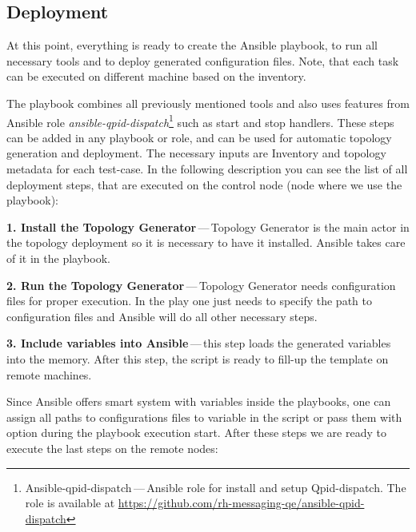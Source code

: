 \subsection{Deployment}
At this point, everything is ready to create the Ansible playbook, to run all necessary tools and to deploy generated configuration files. Note, that each task can be executed on different machine based on the inventory.

The playbook combines all previously mentioned tools and also uses features from Ansible role \emph{ansible-qpid-dispatch}\footnote{Ansible-qpid-dispatch\,---\,Ansible role for install
and setup Qpid-dispatch. The role is available at \url{https://github.com/rh-messaging-qe/ansible-qpid-dispatch}} such as start and stop handlers. These steps can be added in any playbook or role, and can be used for automatic topology generation and deployment. The necessary inputs are Inventory and topology metadata for each test-case. In the following description you can see the list of all deployment steps, that are executed on the control node (node where we use the playbook):

\begin{description}
	\item \textbf{1. Install the Topology Generator}\,---\,Topology Generator is the main actor in the topology deployment so it is necessary to have it installed. Ansible takes care of it in the playbook.
	\item \textbf{2. Run the Topology Generator}\,---\,Topology Generator needs configuration files for proper execution. In the play one just needs to specify the path to configuration files and Ansible will do all other necessary steps.
	\item \textbf{3. Include variables into Ansible}\,---\,this step loads the generated variables into the memory. After this step, the script is ready to fill-up the template on remote machines.
\end{description}

Since Ansible offers smart system with variables inside the playbooks, one can assign all paths to configurations files to variable in the script or pass them with option during the playbook execution start. After these steps we are ready to execute the last steps on the remote nodes:

